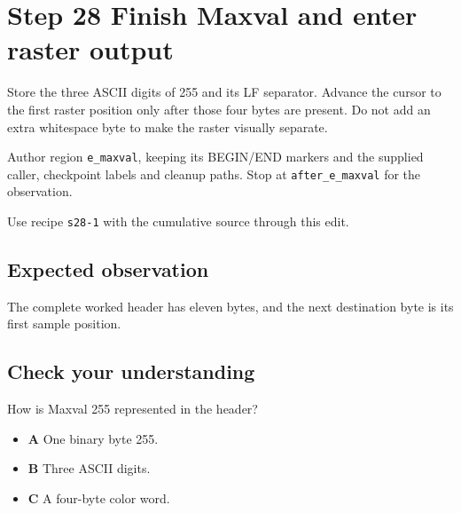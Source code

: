 \section{Step 28 Finish Maxval and enter raster output}\label{ppm-s28}

Store the three ASCII digits of 255 and its LF separator. Advance the cursor to the first raster position only after those four bytes are present. Do not add an extra whitespace byte to make the raster visually separate.

Author region \texttt{e\_maxval}, keeping its BEGIN/END markers and the supplied caller, checkpoint labels and cleanup paths. Stop at \texttt{after\_e\_maxval} for the observation.

Use recipe \texttt{s28-1} with the cumulative source through this edit.

\subsection{Expected observation}
The complete worked header has eleven bytes, and the next destination byte is its first sample position.

\subsection{Check your understanding}
How is Maxval 255 represented in the header?

\begin{itemize}
  \item \textbf{A} One binary byte 255.
  \item \textbf{B} Three ASCII digits.
  \item \textbf{C} A four-byte color word.
\end{itemize}
